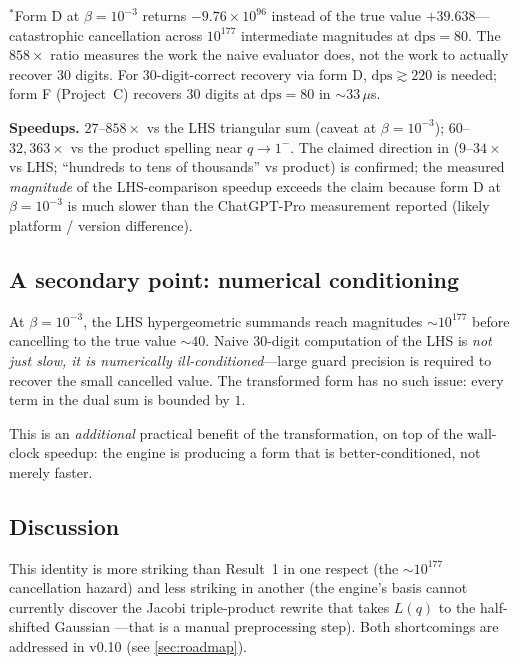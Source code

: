 \documentclass[11pt,reqno]{amsart}
\theoremstyle{definition}
\newcommand{\dps}{\mathrm{dps}}
\begin{document}
\noindent
$^{*}$Form D at $\beta = 10^{-3}$ returns $-9.76 \times 10^{96}$
instead of the true value $+39.638$---catastrophic cancellation
across $10^{177}$ intermediate magnitudes at $\dps = 80$. The
$858\times$ ratio measures the work the naive evaluator does, not the
work to actually recover $30$ digits. For $30$-digit-correct recovery
via form D, $\dps \gtrsim 220$ is needed; form F (Project~C) recovers
$30$ digits at $\dps = 80$ in $\sim 33\,\mu$s.

\textbf{Speedups.} $27$--$858\times$ vs the LHS triangular sum
(caveat at $\beta = 10^{-3}$); $60$--$32{,}363\times$ vs the product
spelling near $q \to 1^-$. The claimed direction in
\cite[diary~42]{ProjectC} ($9$--$34\times$ vs LHS; ``hundreds to
tens of thousands'' vs product) is confirmed; the measured
\emph{magnitude} of the LHS-comparison speedup exceeds the claim
because form D at $\beta = 10^{-3}$ is much slower than the
ChatGPT-Pro measurement reported (likely platform / version
difference).

\subsection{A secondary point: numerical conditioning}\label{sec:conditioning}

At $\beta = 10^{-3}$, the LHS hypergeometric summands reach
magnitudes $\sim 10^{177}$ before cancelling to the true value
$\sim 40$. Naive $30$-digit computation of the LHS is \emph{not just
slow, it is numerically ill-conditioned}---large guard precision is
required to recover the small cancelled value. The transformed form
has no such issue: every term in the dual sum is bounded by $1$.

This is an \emph{additional} practical benefit of the
transformation, on top of the wall-clock speedup: the engine is
producing a form that is better-conditioned, not merely faster.

\subsection{Discussion}

This identity is more striking than Result~1 in one respect (the
$\sim 10^{177}$ cancellation hazard) and less striking in another
(the engine's basis cannot currently discover the Jacobi
triple-product rewrite that takes $L(q)$ to the half-shifted Gaussian
---that is a manual preprocessing step). Both shortcomings are
addressed in v0.10 (see \cref{sec:roadmap}).
\end{document}
